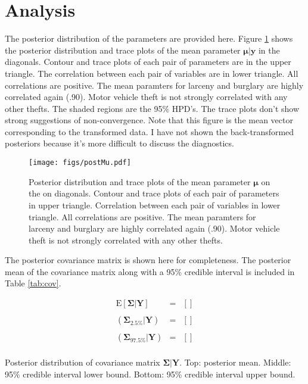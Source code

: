 \documentclass{../../tex_template/asaproc}
\newcommand{\bk}[1]{\left[#1\right]}
\newcommand{\E}{ \text{E} }
\begin{document}
\section{Analysis}
The posterior distribution of the parameters are provided here. Figure
\ref{fig:postMu} shows the posterior distribution and trace plots of the mean
parameter $\bm{\mu | y}$ in the diagonals. Contour and trace plots of each
pair of parameters are in the upper triangle. The correlation between each pair of
variables are in lower triangle.  All correlations are positive. The mean paramters
for larceny and burglary are highly correlated again (.90). Motor vehicle theft
is not strongly correlated with any other thefts. The shaded regions are the 95\% 
HPD's. The trace plots don't show strong suggestions of non-convergence. Note that
this figure is the mean vector corresponding to the transformed data. I have not
shown the back-transformed posteriors because it's more difficult to discuss the 
diagnostics.
\begin{figure}[H]
  \centering
  \texttt{[image: figs/postMu.pdf]}
  \caption{\small Posterior distribution and trace plots of the mean parameter
    $\bm\mu$ on the on diagonals. Contour and trace plots of each pair of
    parameters in upper triangle.  Correlation between each pair of variables
    in lower triangle.  All correlations are positive. The mean paramters for
    larceny and burglary are highly correlated again (.90). Motor vehicle theft
    is not strongly correlated with any other thefts.}
  \label{fig:postMu}
\end{figure}
The posterior covariance matrix is shown here for completeness. The posterior
mean of the covariance matrix along with a 95\% credible interval is included
in Table \ref{tab:cov}.

\begin{table}[H]
\[
\begin{array}{lll}
  \E[\bm\Sigma | \bm Y] &=& \bk{} \\
    \\
  (\bm\Sigma_{2.5\%}| \bm Y) &=& \bk{} \\
    \\
    (\bm\Sigma_{97.5\%} | \bm Y) &=& \bk{} \\
\end{array}
\]
\caption{Posterior distribution of covariance matrix $\bm{\Sigma | Y}$.
Top: posterior mean. Middle: 95\% credible interval lower bound.
Bottom: 95\% credible interval upper bound.}
\label{tab:cov}
\end{table}
\end{document}
